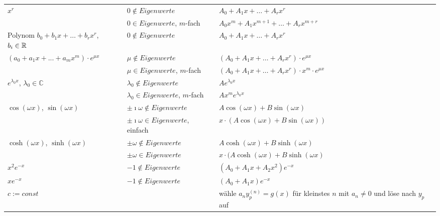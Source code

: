\documentclass[a4paper]{article}
\begin{document}
\begin{fmerke}[Lineare DGL mit konstanten Koeffizienten \hspace{6mm} ($y^{(n)}+a_{n-1}y^{(n-1)}+\ldots+a_1 y'+a_0 y = q(x)$)]
\begin{itemize}
\begin{tabular}{p{3cm}|l|p{7cm}}
					$x^r$ & $0\notin Eigenwerte$ & $A_0+A_1 x+\ldots+A_r x^r$\\
					& $0\in Eigenwerte$, $m$-fach & $A_0 x^m+A_1 x^{m+1}+\ldots+A_r x^{m+r}$\\ \hline
					
					Polynom $b_0+b_1 x+\ldots+b_r x^r$, $b_i\in\mathbb{R}$ & $0\notin Eigenwerte$ & $A_0+A_1 x+\ldots+A_r x^r$\\ \hline
					
					$(a_0 + a_1 x + ... + a_m x^m) \cdot e^{\mu x}$ & $\mu \notin Eigenwerte$ & $(A_0 + A_1x + \hdots + A_rx^r)\cdot e^{\mu x}$ \\
					& $\mu \in Eigenwerte$, $m$-fach & $(A_0 + A_1x + \hdots + A_rx^r)\cdot x^m\cdot e^{\mu x}$ \\ \hline
					$e^{\lambda_0 x}$, $\lambda_0 \in \mathbb{C}$ & $\lambda_0\notin Eigenwerte$ & $Ae^{\lambda_0 x}$\\
					& $\lambda_0\in Eigenwerte$, $m$-fach & $A x^m e^{\lambda_0 x}$\\ \hline
					$\cos\left(\omega x\right)$, $\sin\left(\omega x\right)$ & $\pm\imath \omega \notin Eigenwerte$ & $A\cos\left(\omega x\right)+B\sin\left(\omega x\right)$\\
					& $\pm\imath \omega \in Eigenwerte$, einfach & $x\cdot \left(A\cos\left(\omega x\right)+B\sin\left(\omega x\right)\right)$\\ \hline
					$\cosh(\omega x)$, $\sinh(\omega x)$&$\pm \omega \notin Eigenwerte$&$A\cosh (\omega x)+B\sinh(\omega x)$\\ 
					&$\pm \omega \in Eigenwerte$&$x\cdot(A\cosh(\omega x)+B\sinh(\omega x)$\\ \hline
					
					$x^2 e^{-x}$ & $-1 \notin Eigenwerte$ & $(A_0+A_1 x+A_2 x^2)e^{-x}$\\ \hline

					$x e^{-x}$ & $-1 \notin Eigenwerte$ & $(A_0+A_1 x)e^{-x}$\\ \hline
					
					$c := const$ & & wähle $a_n y_p^{(n)}=g(x)$ für kleinstes $n$ mit $a_n \neq 0$ und löse nach $y_p$ auf\\
				\end{tabular}
			\end{itemize}
			\vspace{-4mm}
		\end{fmerke}
		\vspace{-5mm}
		
\end{document}
